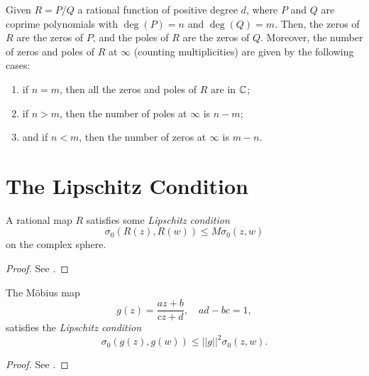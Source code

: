 \begin{remark}
    Given $R=P/Q$ a rational function of positive degree $d$, where $P$ and $Q$
    are coprime polynomials with $\deg(P) = n$ and $\deg(Q) = m$. Then, the
    zeros of $R$ are the zeros of $P$, and the poles of $R$ are the zeros of
    $Q$. Moreover, the number of zeros and poles of $R$ at $\infty$ (counting
    multiplicities) are given by the following cases:
    \begin{enumerate}[label=(\roman*)]
        \item if $n = m$, then all the zeros and poles of $R$ are in $\mathbb{C}$;
        \item if $n > m$, then the number of poles at $\infty$ is $n-m$;
        \item and if $n < m$, then the number of zeros at $\infty$ is $m-n$.
    \end{enumerate}
\end{remark}

\section{The Lipschitz Condition}
\label{sec:the_lipschitz_condition}

\begin{theorem}
    \label{thm:rational_maps_satify_a_lipschitz_condition}
    A rational map $R$ satisfies some \emph{Lipschitz condition}
    \begin{equation*}
        \sigma_0(R(z), R(w)) \leq M\sigma_0(z,w)
    \end{equation*}
    on the complex sphere.
\end{theorem}
\begin{proof}
    See \cite[33]{Beardon1991}.
\end{proof}

\begin{theorem}
    The Möbius map
    \begin{equation*}
        g(z) = \frac{az + b}{cz+d},\quad ad-bc = 1,
    \end{equation*}
    satisfies the \emph{Lipschitz condition}
    \begin{equation*}
        \sigma_0(g(z), g(w)) \leq ||g||^2 \sigma_0(z, w).
    \end{equation*}
\end{theorem}
\begin{proof}
    See \cite[33--34]{Beardon1991}.
\end{proof}

